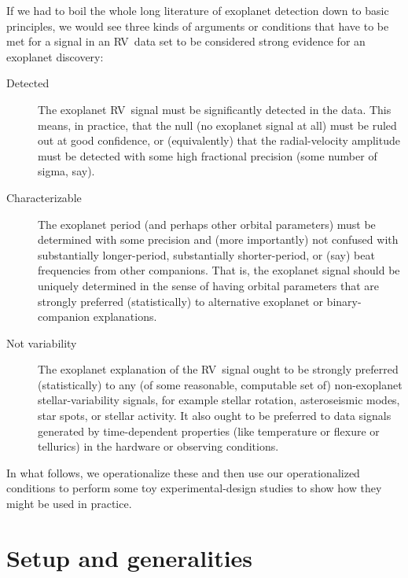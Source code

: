 \documentclass[modern]{aastex63}
\newcommand{\acronym}[1]{{\small{#1}}}
\newcommand{\rv}{\acronym{RV}}
\begin{document}
If we had to boil the whole long literature of exoplanet detection
down to basic principles,
we would see three kinds of arguments or conditions that have to be
met for a signal in an \rv\ data set to be considered strong evidence
for an exoplanet discovery:
\begin{description}
\item[Detected]
The exoplanet \rv\ signal must be significantly detected in the
data. This means, in practice, that the null (no exoplanet signal at
all) must be ruled out at good confidence, or (equivalently) that the
radial-velocity amplitude must be detected with some high fractional
precision (some number of sigma, say).
\item[Characterizable]
The exoplanet period (and perhaps other orbital parameters) must be
determined with some precision and (more importantly) not confused
with substantially longer-period, substantially shorter-period, or
(say) beat frequencies from other companions. That is, the exoplanet
signal should be uniquely determined in the sense of having orbital
parameters that are strongly preferred (statistically) to alternative
exoplanet or binary-companion explanations.
\item[Not variability]
The exoplanet explanation of the \rv\ signal ought to be strongly
preferred (statistically) to any (of some reasonable, computable set
of) non-exoplanet stellar-variability signals, for example stellar
rotation, asteroseismic modes, star spots, or stellar activity.
It also ought to be preferred to data signals generated by
time-dependent properties (like temperature or flexure or tellurics)
in the hardware or observing conditions.
\end{description}
In what follows, we operationalize these and then use our
operationalized conditions to perform some toy experimental-design
studies to show how they might be used in practice.

\section{Setup and generalities}
\end{document}
